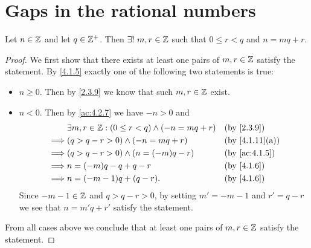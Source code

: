 \section{Gaps in the rational numbers}\label{sec:4.4}

\begin{ac}\label{ac:4.4.1}
  Let \(n \in \mathbb{Z}\) and let \(q \in \mathbb{Z}^+\).
  Then \(\exists!\ m, r \in \mathbb{Z}\) such that \(0 \leq r < q\) and \(n = mq + r\).
\end{ac}

\begin{proof}
  We first show that there exists at least one pairs of \(m, r \in \mathbb{Z}\) satisfy the statement.
  By \cref{4.1.5} exactly one of the following two statements is true:
  \begin{itemize}
    \item \(n \geq 0\).
          Then by \cref{2.3.9} we know that such \(m, r \in \mathbb{Z}\) exist.
    \item \(n < 0\).
          Then by \cref{ac:4.2.7} we have \(-n > 0\) and
          \begin{align*}
                     & \exists m, r \in \Z : (0 \leq r < q) \land (-n = mq + r) &  & \by{2.3.9}     \\
            \implies & (q > q - r > 0) \land (-n = mq + r)                      &  & \by{4.1.11}[a] \\
            \implies & (q > q - r > 0) \land (n = (-m)q - r)                    &  & \by{ac:4.1.5}  \\
            \implies & n = (-m)q - q + q - r                                    &  & \by{4.1.6}     \\
            \implies & n = (-m - 1)q + (q - r).                                 &  & \by{4.1.6}
          \end{align*}
          Since \(-m - 1 \in \mathbb{Z}\) and \(q > q - r > 0\), by setting \(m' = -m - 1\) and \(r' = q - r\) we see that \(n = m'q + r'\) satisfy the statement.
  \end{itemize}
  From all cases above we conclude that at least one pairs of \(m, r \in \mathbb{Z}\) satisfy the statement.


\end{proof}
